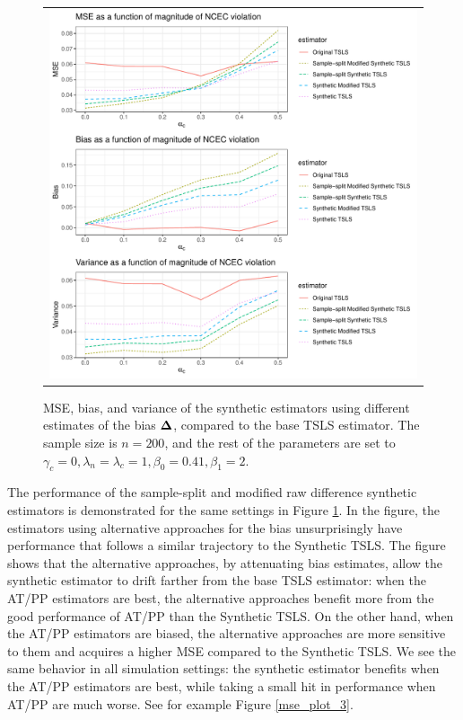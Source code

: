 \documentclass{article}
\begin{document}
\begin{figure}
\centering
\begin{tabular}{c}
\includegraphics[width =\textwidth]{figures/synthetics-compare-plot.pdf}
\end{tabular}\vspace{0.2in}
\caption{MSE, bias, and variance of the synthetic estimators using different estimates of the bias $\boldsymbol{\Delta}$, compared to the base TSLS estimator. The sample size is $n = 200$, and the rest of the parameters are set to $\gamma_c = 0, \lambda_n = \lambda_c = 1, \beta_0 = 0.41, \beta_1 = 2$.}\label{mse_plot_2}
\end{figure}
%
The performance of the sample-split and modified raw difference synthetic estimators is demonstrated for the same settings in Figure \ref{mse_plot_2}. In the figure, the estimators using alternative approaches for the bias unsurprisingly have performance that follows a similar trajectory to the Synthetic TSLS. The figure shows that the alternative approaches, by attenuating bias estimates, allow the synthetic estimator to drift farther from the base TSLS estimator: when the AT/PP estimators are best, the alternative approaches benefit more from the good performance of AT/PP than the Synthetic TSLS. On the other hand, when the AT/PP estimators are biased, the alternative approaches are more sensitive to them and acquires a higher MSE compared to the Synthetic TSLS. We see the same behavior in all simulation settings: the synthetic estimator benefits when the AT/PP estimators are best, while taking a small hit in performance when AT/PP are much worse. See for example Figure \ref{mse_plot_3}.
\end{document}
